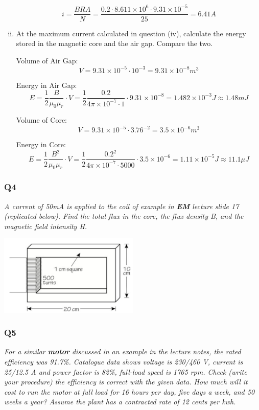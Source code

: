 \documentclass[a4paper,11pt]{article}
\begin{document}
\begin{enumerate}[i.]
          $$i = \frac{BRA}{N} = \frac{0.2\cdot 8.611\times10^6\cdot 9.31\times 10^{-5}}{25} = 6.41A$$

    \item At the maximum current calculated in question (iv), calculate the energy stored in the magnetic core and the air gap. Compare the two.

          Volume of Air Gap:
          $$V = 9.31\times10^{-5}\cdot 10^{-3} = 9.31\times10^{-8}m^3$$

          Energy in Air Gap:
          $$E = \frac{1}{2}\frac{B}{\mu_0 \mu_r}\cdot V = \frac{1}{2}\frac{0.2}{4\pi\times10^{-7}\cdot 1}\cdot 9.31\times10^{-8} = 1.482\times 10^{-3}J \approx 1.48m J$$

          Volume of Core:
          $$V = 9.31\times10^{-5}\cdot 3.76^{-2} = 3.5\times10^{-6}m^3$$

          Energy in Core:
          $$E = \frac{1}{2}\frac{B^2}{\mu_0 \mu_r}\cdot V = \frac{1}{2}\frac{0.2^2}{4\pi\times10^{-7}\cdot 5000}\cdot 3.5\times10^{-6} = 1.11\times 10^{-5}J \approx 11.1\mu J$$

\end{enumerate}


\subsubsection*{Q4}
\textit{A current of 50mA is applied to the coil of example in \textbf{EM} lecture slide 17 (replicated below). Find the total flux in the core, the flux density B, and the magnetic field intensity H.}

\begin{center}
    \includegraphics[width=0.5\textwidth]{core.png}
\end{center}

\subsubsection*{Q5}
\textit{For a similar \textbf{motor} discussed in an example in the lecture notes, the rated efficiency was 91.7\%. Catalogue data shows voltage is 230/460 V, current is 25/12.5 A and power factor is 82\%, full-load speed is 1765 rpm. Check (write your procedure) the efficiency is correct with the given data. How much will it cost to run the motor at full load for 16 hours per day, five days a week, and 50 weeks a year? Assume the plant has a contracted rate of 12 cents per kwh.}
\end{document}
